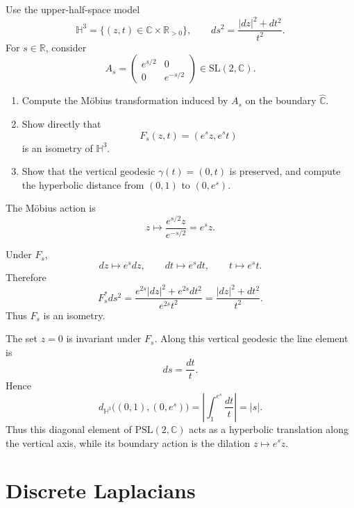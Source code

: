 \begin{problem}
\label{prob:vii-gap-36}
Use the upper-half-space model
\[
\mathbb{H}^3
=
\{(z,t)\in\mathbb{C}\times\mathbb{R}_{>0}\},
\qquad
ds^2=\frac{|dz|^2+dt^2}{t^2}.
\]
For \(s\in\mathbb{R}\), consider
\[
A_s=
\begin{pmatrix}
e^{s/2}&0\\
0&e^{-s/2}
\end{pmatrix}
\in \mathrm{SL}(2,\mathbb{C}).
\]

\begin{enumerate}
\item Compute the Möbius transformation induced by \(A_s\) on the
      boundary \(\widehat{\mathbb{C}}\).
\item Show directly that
      \[
      F_s(z,t)=(e^s z,e^s t)
      \]
      is an isometry of \(\mathbb{H}^3\).
\item Show that the vertical geodesic \(\gamma(t)=(0,t)\) is preserved,
      and compute the hyperbolic distance from \((0,1)\) to \((0,e^s)\).
\end{enumerate}
\end{problem}

\begin{solution}
The Möbius action is
\[
z\longmapsto
\frac{e^{s/2}z}{e^{-s/2}}
=e^s z.
\]

Under \(F_s\),
\[
dz\longmapsto e^s dz,
\qquad
dt\longmapsto e^s dt,
\qquad
t\longmapsto e^s t.
\]
Therefore
\[
F_s^*ds^2
=
\frac{e^{2s}|dz|^2+e^{2s}dt^2}{e^{2s}t^2}
=
\frac{|dz|^2+dt^2}{t^2}.
\]
Thus \(F_s\) is an isometry.

The set \(z=0\) is invariant under \(F_s\).  Along this vertical
geodesic the line element is
\[
ds=\frac{dt}{t}.
\]
Hence
\[
d_{\mathbb H^3}\bigl((0,1),(0,e^s)\bigr)
=
\left|\int_1^{e^s}\frac{dt}{t}\right|
=
|s|.
\]
Thus this diagonal element of \(\mathrm{PSL}(2,\mathbb C)\) acts as a
hyperbolic translation along the vertical axis, while its boundary
action is the dilation \(z\mapsto e^s z\).
\end{solution}


\section{Discrete Laplacians}

